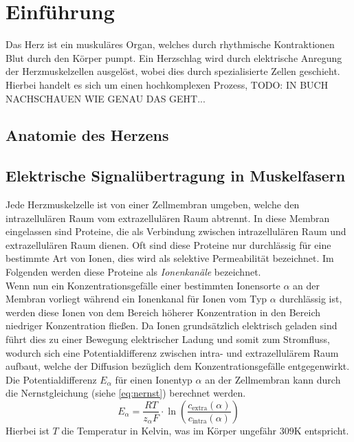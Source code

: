 \documentclass[
	a4paper,			%
	11pt,				%
	headsepline,		%
	bibtotoc,			%
	BCOR18mm,      		%
	DIV14,				%
	headings=normal,
	numbers=noenddot,
]{scrbook}
\theoremstyle{mythmstyle}
\theoremstyle{other}
\begin{document}
	\chapter{Einführung}
	 Das Herz ist ein muskuläres Organ, welches durch rhythmische Kontraktionen Blut
	 durch den Körper pumpt. Ein Herzschlag wird durch elektrische Anregung der
	 Herzmuskelzellen ausgelöst, wobei dies durch spezialisierte Zellen geschieht.\cite[S.~29]
	 {modelling} Hierbei handelt es sich um einen hochkomplexen
	   Prozess, TODO: 	IN BUCH NACHSCHAUEN WIE GENAU DAS GEHT...
	 
	\section{Anatomie des Herzens}
	\section{Elektrische Signalübertragung in Muskelfasern}
	Jede Herzmuskelzelle ist von einer Zellmembran umgeben, welche den intrazellulären Raum vom extrazellulären
	Raum abtrennt. In diese Membran eingelassen sind Proteine, die als Verbindung zwischen 
	intrazellulären Raum und extrazellulären Raum dienen. Oft sind diese Proteine nur durchlässig für eine
	bestimmte Art von Ionen, dies wird als selektive Permeabilität bezeichnet. \cite{cell} 
	Im Folgenden werden diese Proteine als \emph{Ionenkanäle} bezeichnet.\\
	Wenn nun ein Konzentrationsgefälle einer bestimmten Ionensorte $\alpha$ an der Membran
	 vorliegt während ein Ionenkanal für Ionen vom Typ $\alpha$ durchlässig ist, werden diese Ionen von
	dem Bereich höherer Konzentration in den Bereich niedriger Konzentration fließen. Da Ionen grundsätzlich
	elektrisch geladen sind führt dies zu einer Bewegung elektrischer Ladung und somit zum Stromfluss, wodurch
	sich eine Potentialdifferenz zwischen intra- und extrazellulärem Raum aufbaut, welche der Diffusion
	bezüglich dem Konzentrationsgefälle entgegenwirkt. \\
	Die Potentialdifferenz $E_{\alpha}$ für einen Ionentyp $\alpha$ an der Zellmembran kann durch die
	 Nernstgleichung (siehe
	 \autoref{eq:nernst}) berechnet werden.
	\begin{equation}
		E_{\alpha} = \frac{RT}{z_{\alpha}F} \cdot 
		\ln \left(\frac{c_{\text{extra}}(\alpha)}{c_{\text{intra}}(\alpha)}\right)
	\label{eq:nernst}
	\end{equation}
	Hierbei ist $T$ die Temperatur in Kelvin, was im Körper ungefähr $309\mathrm{K}$ entspricht.\\ 
\end{document}
